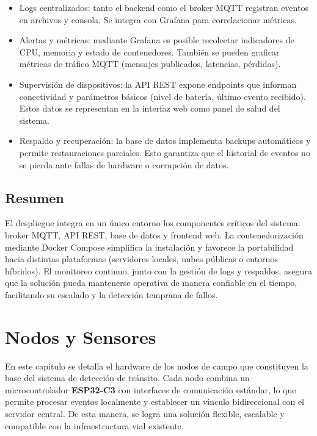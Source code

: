 \begin{itemize}
    \item Logs centralizados: tanto el backend como el broker MQTT registran eventos en archivos y consola. Se  integra con Grafana para correlacionar métricas.
    
    \item Alertas y métricas: mediante Grafana es posible recolectar indicadores de CPU, memoria y estado de contenedores. También se pueden graficar métricas de tráfico MQTT (mensajes publicados, latencias, pérdidas).
    
    \item Supervisión de dispositivos: la API REST expone endpoints que informan conectividad y parámetros básicos (nivel de batería, último evento recibido). Estos datos se representan en la interfaz web como panel de salud del sistema.
    
    \item Respaldo y recuperación: la base de datos implementa backups automáticos y permite restauraciones parciales. Esto garantiza que el historial de eventos no se pierda ante fallas de hardware o corrupción de datos.
\end{itemize}

\subsection{Resumen}

El despliegue integra en un único entorno los componentes críticos del sistema: broker MQTT, API REST, base de datos y frontend web.  
La contenedorización mediante Docker Compose simplifica la instalación y favorece la portabilidad hacia distintas plataformas (servidores locales, nubes públicas o entornos híbridos).  
El monitoreo continuo, junto con la gestión de logs y respaldos, asegura que la solución pueda mantenerse operativa de manera confiable en el tiempo, facilitando su escalado y la detección temprana de fallos.




\section{Nodos y Sensores}
\label{sec:nodos-sensores}

\label{sec:nodos-sensores}

En este capítulo se detalla el hardware de los nodos de campo que constituyen la base del sistema de detección de tránsito. Cada nodo combina un microcontrolador \textbf{ESP32-C3} con interfaces de comunicación estándar, lo que permite procesar eventos localmente y establecer un vínculo bidireccional con el servidor central. De esta manera, se logra una solución flexible, escalable y compatible con la infraestructura vial existente.

